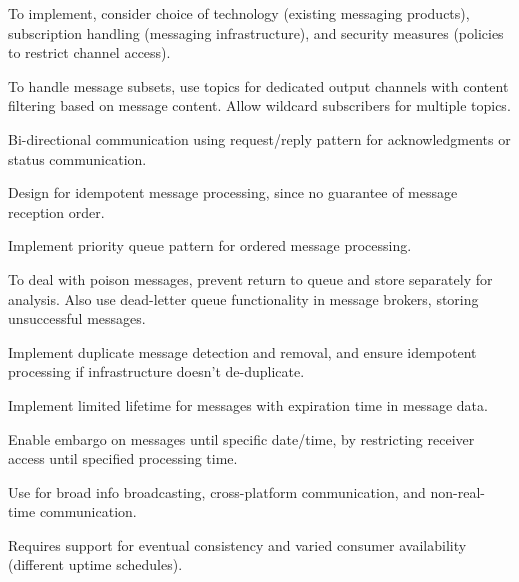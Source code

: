 \documentclass[11pt]{article}
\begin{document}
To implement, consider choice of technology (existing messaging products),
subscription handling (messaging infrastructure), and security measures
(policies to restrict channel access).

To handle message subsets, use topics for dedicated output channels with
content filtering based on message content.
Allow wildcard subscribers for multiple topics.

Bi-directional communication using request/reply pattern for acknowledgments
or status communication.

Design for idempotent message processing, since no guarantee of message
reception order.

Implement priority queue pattern for ordered message processing.

To deal with poison messages, prevent return to queue and store separately
for analysis.
Also use dead-letter queue functionality in message brokers, storing
unsuccessful messages.

Implement duplicate message detection and removal, and ensure
idempotent processing if infrastructure doesn't de-duplicate.

Implement limited lifetime for messages with expiration time in message data.

Enable embargo on messages until specific date/time, by restricting receiver
access until specified processing time.

Use for broad info broadcasting, cross-platform communication, and
non-real-time communication.

Requires support for eventual consistency and varied consumer
availability (different uptime schedules).
\end{document}
